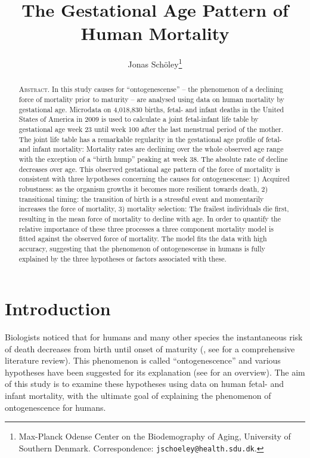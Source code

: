 \documentclass[12pt, parskip=half]{scrartcl}
\title{The Gestational Age Pattern of Human Mortality}
\author{
  Jonas Schöley\footnote{Max-Planck Odense Center on the Biodemography of Aging, University of Southern Denmark. Correspondence: \texttt{jschoeley@health.sdu.dk}.}
}
\begin{document}
\maketitle

\thispagestyle{empty}

\begin{abstract}
\textsc{Abstract.} In this study causes for \enquote{ontogenescense} -- the phenomenon of a declining force of mortality prior to maturity -- are analysed using data on human mortality by gestational age. Microdata on 4,018,830 births, fetal- and infant deaths in the United States of America in 2009 is used to calculate a joint fetal-infant life table by gestational age week 23 until week 100 after the last menstrual period of the mother. The joint life table has a remarkable regularity in the gestational age profile of fetal- and infant mortality: Mortality rates are declining over the whole observed age range with the exception of a \enquote{birth hump} peaking at week 38. The absolute rate of decline decreases over age. This observed gestational age pattern of the force of mortality is consistent with three hypotheses concerning the causes for ontogenescense: 1) Acquired robustness: as the organism growths it becomes more resilient towards death, 2) transitional timing: the transition of birth is a stressful event and momentarily increases the force of mortality, 3) mortality selection: The frailest individuals die first, resulting in the mean force of mortality to decline with age. In order to quantify the relative importance of these three processes a three component mortality model is fitted against the observed force of mortality. The model fits the data with high accuracy, suggesting that the phenomenon of ontogenescense in humans is fully explained by the three hypotheses or factors associated with these.
\end{abstract}

\clearpage


\section{Introduction} %
\label{sec:introduction}

Biologists noticed that for humans and many other species the instantaneous risk of death decreases from birth until onset of maturity (\cite{Medawar1952}, see \cite{Levitis2011} for a comprehensive literature review). This phenomenon is called \enquote{ontogenescence} and various hypotheses have been suggested for its explanation (see \cite{Levitis2011} for an overview). The aim of this study is to examine these hypotheses using data on human fetal- and infant mortality, with the ultimate goal of explaining the phenomenon of ontogenescence for humans.
\end{document}
